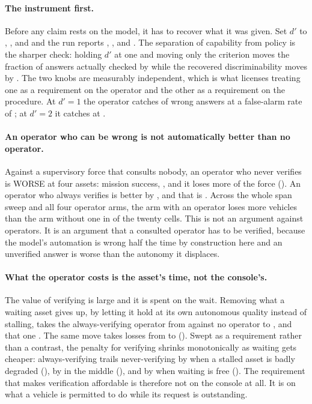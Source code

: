 \documentclass[11pt]{article}
\begin{document}
\paragraph{The instrument first.} Before any claim rests on the model, it has to recover what it was
given. Set $d'$ to \TdZeroSet{}, \TdHalfSet{}, \TdOneSet{} and \TdTwoSet{} and the run reports
\TdZeroGot{}, \TdHalfGot{}, \TdOneGot{} and \TdTwoGot{}. The separation of capability from policy is
the sharper check: holding $d'$ at one and moving only the criterion moves the fraction of answers
actually checked by \TdFracSpread{} while the recovered discriminability moves by \TdCritSpread{}.
The two knobs are measurably independent, which is what licenses treating one as a requirement on
the operator and the other as a requirement on the procedure. At $d' = 1$ the operator catches
\TdOneHit{} of wrong answers at a false-alarm rate of \TdOneFa{}; at $d' = 2$ it catches
\TdTwoHit{} at \TdTwoFa{}.

\paragraph{An operator who can be wrong is not automatically better than no operator.} Against a
supervisory force that consults nobody, an operator who never verifies is WORSE at four assets:
\ToNeverSuccLow{} mission success, \ToNeverSuccLowV{}, and it loses \ToNeverLossLow{} more of the
force (\ToNeverLossLowV{}). An operator who always verifies is better by \ToAlwaysSuccLow{}, and
that is \ToAlwaysSuccLowV{}. Across the whole span sweep and all four operator arms, the arm with an
operator loses more vehicles than the arm without one in \ToLossUpCells{} of the twenty cells. This
is not an argument against operators. It is an argument that a consulted operator has to be
verified, because the model's automation is wrong half the time by construction here and an
unverified answer is worse than the autonomy it displaces.

\paragraph{What the operator costs is the asset's time, not the console's.} The value of verifying
is large and it is spent on the wait. Removing what a waiting asset gives up, by letting it hold at
its own autonomous quality instead of stalling, takes the always-verifying operator from
\ToAlwaysSuccLow{} against no operator to \ToFreeAlwaysSuccLow{}, and that one \ToFreeAlwaysSuccLowV{}.
The same move takes losses from \ToAlwaysLossLow{} to \ToFreeAlwaysLossLow{} (\ToFreeAlwaysLossLowV{}).
Swept as a requirement rather than a contrast, the penalty for verifying shrinks monotonically as
waiting gets cheaper: always-verifying trails never-verifying by \TsLow{} when a stalled asset is
badly degraded (\TsLowV{}), by \TsMid{} in the middle (\TsMidV{}), and by \TsHigh{} when waiting is
free (\TsHighV{}). The requirement that makes verification affordable is therefore not on the
console at all. It is on what a vehicle is permitted to do while its request is outstanding.
\end{document}
